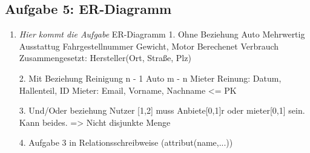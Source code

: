 \subsection{Aufgabe 5: ER-Diagramm}
\label{sec:Aufgabe5}
\begin{enumerate}[label=\alph*)]
    \item \textit{Hier kommt die Aufgabe}
    ER-Diagramm
1. Ohne Beziehung
Auto Mehrwertig Ausstattug
    Fahrgestellnummer
    Gewicht, Motor
    Berechenet Verbrauch
    Zusammengesetzt: Hersteller(Ort, Straße, Plz)

2. Mit Beziehung
Reinigung n - 1 Auto m - n Mieter
Reinung: Datum, Hallenteil, ID
Mieter: Email, Vorname, Nachname <= PK

3. Und/Oder beziehung
Nutzer [1,2] muss Anbiete[0,1]r oder mieter[0,1] sein. Kann beides.
=> Nicht disjunkte Menge

4. Aufgabe 3 in Relationsschreibweise (attribut(name,...))
\end{enumerate}

